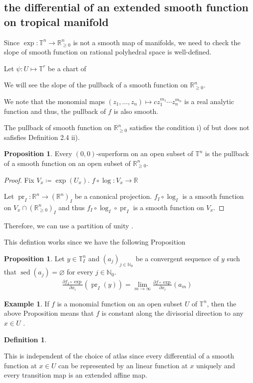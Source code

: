 \documentclass[a4paper,dvipdfmx,reqno,12pt]{amsart}
\theoremstyle{definition}
\newtheorem{Def}[Thm]{Definition}
\newtheorem{Eg}[Thm]{Example}
\newtheorem{Prop}[Thm]{Proposition}
\newcommand{\deq}{\coloneqq}
\newcommand{\emp}{\varnothing}%
\newcommand{\R}{\mathbb{R}}%
\newcommand{\N}{\mathbb{N}_{0}}%
\newcommand{\mb}[1]{\mathbb{#1}}%
\newcommand{\opn}[1]{\operatorname{#1}}
\numberwithin{equation}{section}
\begin{document}
\subsection{the differential of an extended 
smooth function on tropical manifold}

Since $\opn{exp}:\mb{T}^{n}\to \R_{\geq 0}^{n}$ is not 
a smooth map of manifolds, we need to check the slope of 
smooth function on rational polyhedral space is well-defined.

Let $\psi\colon U\mapsto \mb{T}^{r}$ be a chart of 

We will see the slope of the pullback of a smooth 
function on $\R_{\geq 0}^{n}$.

We note that the monomial maps 
$(z_1,\ldots,z_n)\mapsto cz_1^{m_1}\cdots z_n^{m_n}$ is a real 
analytic function and thus, the pullback of $f$ is also 
smooth.

The pullback of smooth function on $\R_{\geq 0}^{n}$ satisfies
the condition i) of \cite[Definition 2.4]{MR3903579} 
but does not safisfies Definition 2.4 ii).

\begin{Prop}
Every $(0,0)$-superform on an open subset of $\mb{T}^{n}$ is the pullback
of a smooth function on an open subset of $\R_{\geq 0}^{n}$.
\end{Prop}

\begin{proof}
Fix $V_x\deq \opn{exp}(U_x)$. $f\circ \opn{log}\colon V_x \to \R$

Let $\opn{pr}_I\colon \R^{n} \to (\R^{n})_I$ be 
a canonical projection. $f_I \circ \opn{log}_I$ is a smooth 
function on $V_x \cap (\R_{\geq 0}^{n})_I$ and thus
$f_I \circ \opn{log}_I \circ \opn{pr}_I$ is a smooth function on 
$V_x$.
\end{proof}
Therefore, we can use a partition of unity \cite[Lemma 2.7]{MR3903579}.

This defintion works since we have the following Proposition
\begin{Prop}
Let $y\in \mb{T}_I^{n}$ and
$(a_j)_{j\in \N}$ be a convergent sequence of $y$ such that 
$\opn{sed}(a_j)=\emp$ for every $j\in \N$.
\begin{align}
\frac{\partial f_I\circ \opn{exp}}{\partial x_i}(\opn{pr}_I(y))
=\lim_{m\to \infty}\frac{\partial f\circ \opn{exp}}{\partial x_i}(a_m)
\end{align}

\end{Prop}

\begin{Eg}
If $f$ is a monomial function on an open subset $U$ of $\mb{T}^{n}$, then the above Proposition means that
$f$ is constant along the divisorial direction to any $x\in U$
\cite[Definition 3.2]{jellLefschetzTheoremTropical2018a}.
\end{Eg}
\begin{Def}

\end{Def}
This is independent of the choice of atlas since every differential 
of a smooth function at $x\in U$ can be represented by an
linear function at $x$ uniquely and every transition map is an 
extended affine map.
\end{document}
